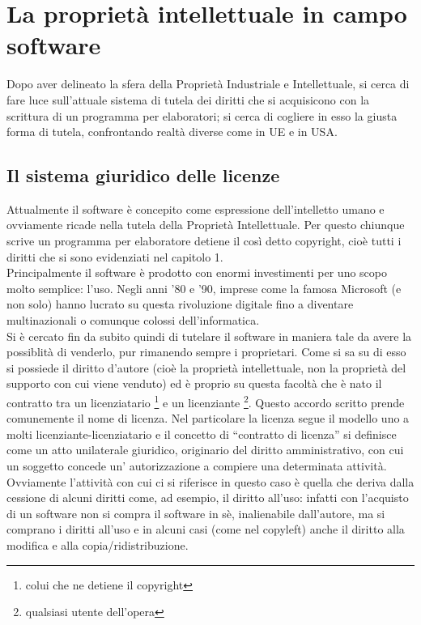 \chapter{La proprietà intellettuale in campo software}
Dopo aver delineato la sfera della Proprietà Industriale e Intellettuale, si cerca di fare luce sull'attuale sistema di tutela dei diritti che si acquisicono con la scrittura di un programma per elaboratori; si cerca di cogliere in esso la giusta forma di tutela, confrontando realtà diverse come in UE e in USA. 

\section{Il sistema giuridico delle licenze}
Attualmente il software è concepito come espressione dell'intelletto umano e ovviamente ricade nella tutela della Proprietà Intellettuale. Per questo chiunque scrive un programma per elaboratore detiene il così detto copyright, cioè tutti i diritti che si sono evidenziati nel capitolo 1.\\
Principalmente il software è prodotto con enormi investimenti per uno scopo molto semplice: l'uso. Negli anni '80 e '90, imprese come la famosa Microsoft (e non solo) hanno lucrato su questa rivoluzione digitale fino a diventare multinazionali o comunque colossi dell'informatica.\\
Si è cercato fin da subito quindi di tutelare il software in maniera tale da avere la possiblità di venderlo, pur rimanendo sempre i proprietari. Come si sa su di esso si possiede il diritto d'autore (cioè la proprietà intellettuale, non la proprietà del supporto con cui viene venduto) ed è proprio su questa facoltà che è nato il contratto tra un licenziatario \footnote{colui che ne detiene il copyright} e un licenziante \footnote{qualsiasi utente dell'opera}. Questo accordo scritto prende comunemente il nome di licenza.
Nel particolare la licenza segue il modello uno a molti licenziante-licenziatario e il concetto di ``contratto di licenza'' si definisce come un atto unilaterale giuridico, originario del diritto amministrativo, con cui un soggetto concede un' autorizzazione a compiere una determinata attività.
Ovviamente l'attività con cui ci si riferisce in questo caso è quella che deriva dalla cessione di alcuni diritti come, ad esempio, il diritto all'uso: infatti con l'acquisto di un software non si compra il software in sè, inalienabile dall'autore, ma si comprano i diritti all'uso e in alcuni casi (come nel copyleft) anche il diritto alla modifica e alla copia/ridistribuzione.

